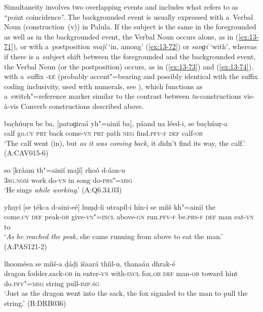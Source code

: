  Simultaneity involves two overlapping events and includes what
\citet[330]{givon2001b} refers to as ``point coincidence''. The backgrounded event
\citep[254--255]{thompsonetal2007} is usually expressed with a~Verbal Noun (construction~(v)) in
Palula. If the subject is the same in the foregrounded as well as in the backgrounded event, the
Verbal Noun occurs alone, as in (\ref{ex:13-71}), or with a~postposition \textit{maǰí} `in,
among' (\ref{ex:13-72}) or \textit{sanɡí} `with', whereas if there is a~subject shift between
the foregrounded and the backgrounded event, the Verbal Noun (or the postposition) occurs, as in
(\ref{ex:13-73}) and (\ref{ex:13-74}), with a~suffix \textsc{-eé} (probably
accent"=bearing and possibly identical with the suffix coding inclusivity, used with numerals, see ), which functions as a~switch"=reference marker similar to the contrast between
\textit{ta}-constructions vis-à-vis Converb constructions described above.

\begin{exe}
\ex
\label{ex:13-71}
\gll bac̣húuṛu be ba, [patuɡiraá yh"=ainií ba], páand na léed-i, se bac̣húuṛ-a \\
calf go.\textsc{cv} \textsc{prt } back come-\textsc{vn }  \textsc{prt} path \textsc{neg} find.\textsc{pfv-f} \textsc{def} calf-\textsc{ob}  \\
\glt `The calf went (in), but \textit{as it was coming back}, it didn't find its way, the calf.' (A:CAV015-6)

\ex
\label{ex:13-72}
\gll so [kráam th"=ainií maǰí] rhoó d-áan-u  \\
\textsc{3sg.nom} work do-\textsc{vn} in song do-\textsc{prs"=msg}  \\
\glt `He sings \textit{while working}.' (A:Q6.34.03)

\ex
\label{ex:13-73}
\gll yhayí [se ṭék-a d-aini-eé] huṇḍ-íi utrapíl-i hín-i se míiš kh"=ainií the \\
come.\textsc{cv} \textsc{def} peak-\textsc{ob} give-\textsc{vn"=incl} above-\textsc{gn} run.\textsc{pfv-f}  be.\textsc{prs-f } \textsc{def} man eat-\textsc{vn} to  \\
\glt `\textit{As he reached the peak}, she came running from above to eat the man.' (A:PAS121-2)

\ex
\label{ex:13-74}
 lhooméea se míiš-a ḍáḍi išaará thíil-u, thanaáu dhrak-é \\
dragon fodder.sack-\textsc{ob} in enter-\textsc{vn} with-\textsc{incl}  fox.\textsc{ob} \textsc{def} man-\textsc{ob} toward hint do.\textsc{pfv"=msg} string pull-\textsc{imp.sg}  \\
\glt `Just as the dragon went into the sack, the fox signaled to the man to pull the string.' (B:DRB036)
\end{exe}

